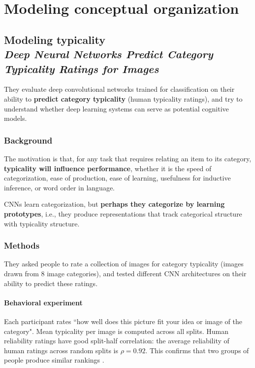 \chapter{Modeling conceptual organization}
\label{chap:modeling_conceptual_organization}

\section[Modeling typicality]{Modeling typicality\\ \large{\textit{Deep Neural Networks Predict Category Typicality Ratings for Images}\\ \cite{lake-2015-deep}}}

They evaluate deep convolutional networks trained for classification on their ability to \textbf{predict category typicality} (human typicality ratings), and try to understand whether deep learning systems can serve as potential cognitive models.

\subsection{Background}
The motivation is that, for any task that requires relating an item to its category, \textbf{typicality will influence performance}, whether it is the speed of categorization, ease of production, ease of learning, usefulness for inductive inference, or word order in language.

CNNs learn categorization, but \textbf{perhaps they categorize by learning prototypes}, i.e., they produce representations that track categorical structure with typicality structure.

\subsection{Methods}
They asked people to rate a collection of images for category typicality (images drawn from 8 image categories), and tested different CNN architectures on their ability to predict these ratings.

\subsubsection{Behavioral experiment}
Each participant rates ``how well does this picture fit your idea or image of the category". Mean typicality per image is computed across all splits. Human reliability ratings have good split-half correlation: the average reliability of human ratings across random splits is $\rho=0.92$. This confirms that two groups of people produce similar rankings \notet.

